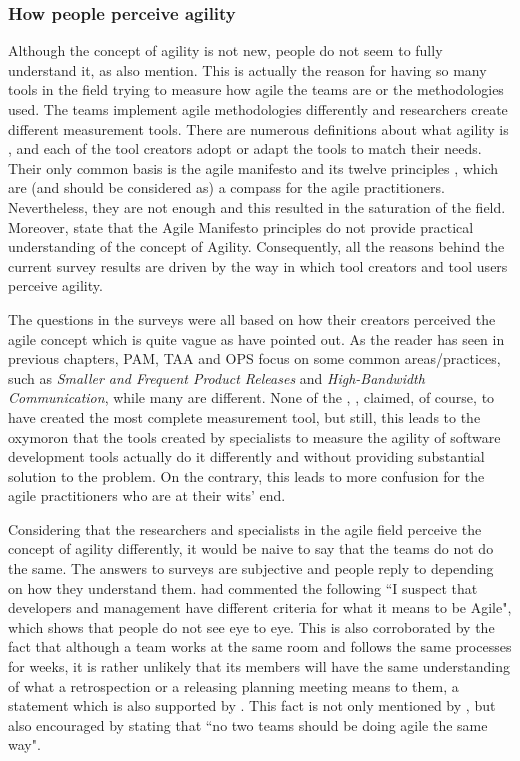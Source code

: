 \subsubsection{How people perceive agility}
Although the concept of agility is not new, people do not seem to fully understand it, as \citet{Wang_Conboy} also mention. This is actually the reason for having so many tools in the field trying to measure how agile the teams are or the methodologies used. The teams implement agile methodologies differently and researchers create different measurement tools. There are numerous definitions about what agility is \cite{Kidd, Kara, Ramesh, agile_manufacturing}, and each of the tool creators adopt or adapt the tools to match their needs. Their only common basis is the agile manifesto \cite{beck2001agile} and its twelve principles \cite{agile_principles}, which are (and should be considered as) a compass for the agile practitioners. Nevertheless, they are not enough and this resulted in the saturation of the field. Moreover, \citet{conboy_fitzgerald} state that the Agile Manifesto principles do not provide practical understanding of the concept of Agility. Consequently, all the reasons behind the current survey results are driven by the way in which tool creators and tool users perceive agility.

The questions in the surveys were all based on how their creators perceived the agile concept which is quite vague as \citet{tsourveloudis} have pointed out. As the reader has seen in previous chapters, \ac{PAM}, \ac{TAA} and \ac{OPS} focus on some common areas/practices, such as  \textit{Smaller and Frequent Product Releases} and \textit{High-Bandwidth Communication}, while many are different. None of the \citet{sventha_dissertation}, \citet{pam}, \citet{Leffingwell} claimed, of course, to have created the most complete measurement tool, but still, this leads to the oxymoron that the tools created by specialists to measure the agility of software development tools actually do it differently and without providing substantial solution to the problem. On the contrary, this leads to more confusion for the agile practitioners who are at their wits' end.

Considering that the researchers and specialists in the agile field perceive the concept of agility differently, it would be naive to say that the teams do not do the same. The answers to surveys are subjective and people reply to depending on how they understand them. \citet{ambler} had commented the following ``I suspect that developers and management have different criteria for what it means to be Agile", which shows that people do not see eye to eye. This is also corroborated by the fact that although a team works at the same room and follows the same processes for weeks, it is rather unlikely that its members will have the same understanding of what a retrospection or a releasing planning meeting means to them, a statement which is also supported by \citet{Williams_Microsoft}. This fact is not only mentioned by \citet{Dave_Thomas}, but also encouraged by stating that ``no two teams should be doing agile the same way".


